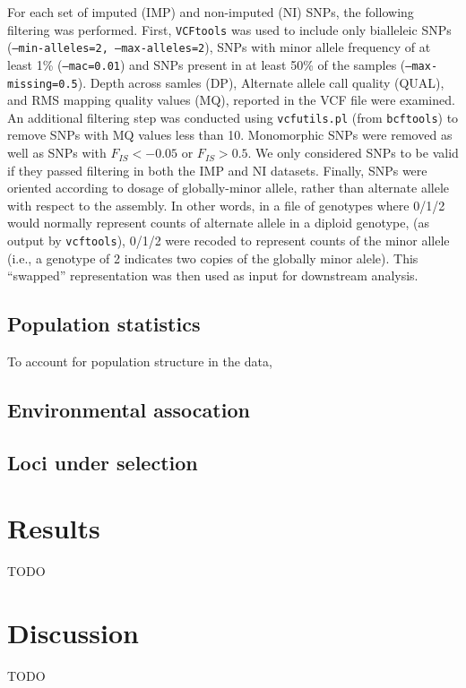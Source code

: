 \documentclass[fleqn,11pt]{wlpeerj}
\begin{document}
For each set of imputed (IMP) and non-imputed (NI) SNPs, the following filtering
was performed.  First, \texttt{VCFtools} was used to include only bialleleic
SNPs (\texttt{--min-alleles=2, --max-alleles=2}), SNPs with minor allele frequency
of at least 1\% (\texttt{--mac=0.01}) and SNPs present in at least 50\% of the
samples (\texttt{--max-missing=0.5}).  Depth across samles (DP), Alternate
allele call quality (QUAL), and RMS mapping quality values (MQ), reported in the
VCF file were examined.  An additional filtering step was conducted using
\texttt{vcfutils.pl} (from \texttt{bcftools}) to remove SNPs with MQ values less
than 10.  Monomorphic SNPs were removed as well as SNPs with
$F_{IS} < -0.05$ or $F_{IS} > 0.5$.  We only considered SNPs to be
valid if they passed filtering in both the IMP and NI datasets. Finally, SNPs
were oriented according to dosage of globally-minor allele, rather than
alternate allele with respect to the assembly. In other words, in a file of
genotypes where 0/1/2 would normally represent counts of alternate allele in a
diploid genotype,  (as output by \texttt{vcftools}), 0/1/2 were recoded to
represent counts of the minor allele (i.e., a genotype of 2 indicates two copies
of the globally minor alele). This ``swapped'' representation was then used as
input for downstream analysis.


\subsection*{Population statistics}
To account for population structure in the data,


\subsection*{Environmental assocation}

\subsection*{Loci under selection}


\subsection*{}

\section*{Results}
TODO


\section*{Discussion}
TODO
\end{document}
